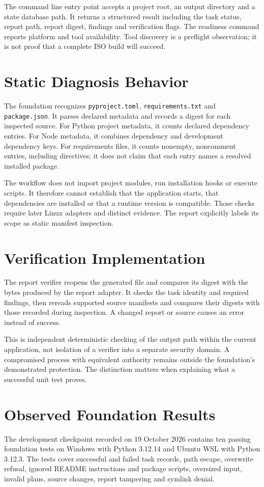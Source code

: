 The command line entry point accepts a project root, an output directory and a state database path. It returns a structured result including the task status, report path, report digest, findings and verification flags. The readiness command reports platform and tool availability. Tool discovery is a preflight observation; it is not proof that a complete ISO build will succeed.

\section{Static Diagnosis Behavior}
The foundation recognizes \texttt{pyproject.toml}, \texttt{requirements.txt} and \texttt{package.json}. It parses declared metadata and records a digest for each inspected source. For Python project metadata, it counts declared dependency entries. For Node metadata, it combines dependency and development dependency keys. For requirements files, it counts nonempty, noncomment entries, including directives; it does not claim that each entry names a resolved installed package.

The workflow does not import project modules, run installation hooks or execute scripts. It therefore cannot establish that the application starts, that dependencies are installed or that a runtime version is compatible. Those checks require later Linux adapters and distinct evidence. The report explicitly labels its scope as static manifest inspection.

\section{Verification Implementation}
The report verifier reopens the generated file and compares its digest with the bytes produced by the report adapter. It checks the task identity and required findings, then rereads supported source manifests and compares their digests with those recorded during inspection. A changed report or source causes an error instead of success.

This is independent deterministic checking of the output path within the current application, not isolation of a verifier into a separate security domain. A compromised process with equivalent authority remains outside the foundation's demonstrated protection. The distinction matters when explaining what a successful unit test proves.

\section{Observed Foundation Results}
The development checkpoint recorded on 19 October 2026 contains ten passing foundation tests on Windows with Python 3.12.14 and Ubuntu WSL with Python 3.12.3. The tests cover successful and failed task records, path escape, overwrite refusal, ignored README instructions and package scripts, oversized input, invalid plans, source changes, report tampering and symlink denial.

